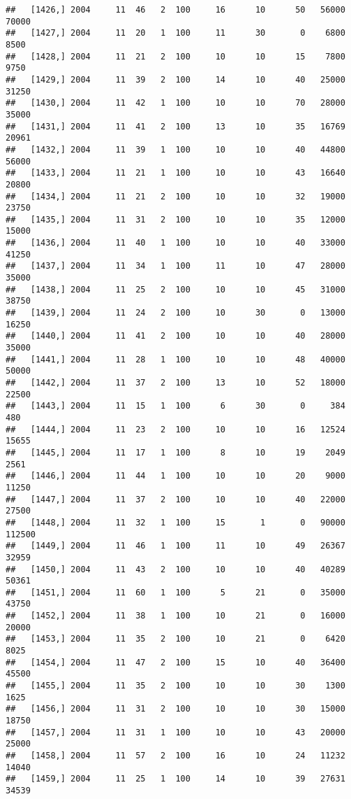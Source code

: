 \documentclass{article}\usepackage[]{graphicx}\usepackage[]{color}
\makeatletter
\newenvironment{kframe}{%
 \def\at@end@of@kframe{}%
 \ifinner\ifhmode%
  \def\at@end@of@kframe{\end{minipage}}%
  \begin{minipage}{\columnwidth}%
 \fi\fi%
 \def\FrameCommand##1{\hskip\@totalleftmargin \hskip-\fboxsep
 \colorbox{shadecolor}{##1}\hskip-\fboxsep
     \hskip-\linewidth \hskip-\@totalleftmargin \hskip\columnwidth}%
 \MakeFramed {\advance\hsize-\width
   \@totalleftmargin\z@ \linewidth\hsize
   \@setminipage}}%
 {\par\unskip\endMakeFramed%
 \at@end@of@kframe}
\newenvironment{knitrout}{}{} %
\makeatother
\begin{document}
\begin{knitrout}
\begin{kframe}
\begin{verbatim}
##   [1426,] 2004     11  46   2  100     16      10      50   56000   70000
##   [1427,] 2004     11  20   1  100     11      30       0    6800    8500
##   [1428,] 2004     11  21   2  100     10      10      15    7800    9750
##   [1429,] 2004     11  39   2  100     14      10      40   25000   31250
##   [1430,] 2004     11  42   1  100     10      10      70   28000   35000
##   [1431,] 2004     11  41   2  100     13      10      35   16769   20961
##   [1432,] 2004     11  39   1  100     10      10      40   44800   56000
##   [1433,] 2004     11  21   1  100     10      10      43   16640   20800
##   [1434,] 2004     11  21   2  100     10      10      32   19000   23750
##   [1435,] 2004     11  31   2  100     10      10      35   12000   15000
##   [1436,] 2004     11  40   1  100     10      10      40   33000   41250
##   [1437,] 2004     11  34   1  100     11      10      47   28000   35000
##   [1438,] 2004     11  25   2  100     10      10      45   31000   38750
##   [1439,] 2004     11  24   2  100     10      30       0   13000   16250
##   [1440,] 2004     11  41   2  100     10      10      40   28000   35000
##   [1441,] 2004     11  28   1  100     10      10      48   40000   50000
##   [1442,] 2004     11  37   2  100     13      10      52   18000   22500
##   [1443,] 2004     11  15   1  100      6      30       0     384     480
##   [1444,] 2004     11  23   2  100     10      10      16   12524   15655
##   [1445,] 2004     11  17   1  100      8      10      19    2049    2561
##   [1446,] 2004     11  44   1  100     10      10      20    9000   11250
##   [1447,] 2004     11  37   2  100     10      10      40   22000   27500
##   [1448,] 2004     11  32   1  100     15       1       0   90000  112500
##   [1449,] 2004     11  46   1  100     11      10      49   26367   32959
##   [1450,] 2004     11  43   2  100     10      10      40   40289   50361
##   [1451,] 2004     11  60   1  100      5      21       0   35000   43750
##   [1452,] 2004     11  38   1  100     10      21       0   16000   20000
##   [1453,] 2004     11  35   2  100     10      21       0    6420    8025
##   [1454,] 2004     11  47   2  100     15      10      40   36400   45500
##   [1455,] 2004     11  35   2  100     10      10      30    1300    1625
##   [1456,] 2004     11  31   2  100     10      10      30   15000   18750
##   [1457,] 2004     11  31   1  100     10      10      43   20000   25000
##   [1458,] 2004     11  57   2  100     16      10      24   11232   14040
##   [1459,] 2004     11  25   1  100     14      10      39   27631   34539

\end{verbatim}
\end{kframe}
\end{knitrout}
\end{document}
